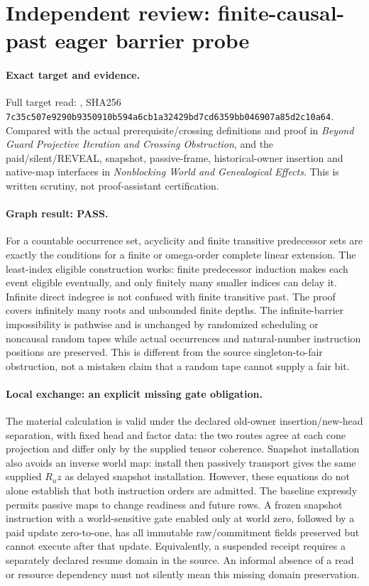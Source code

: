 \documentclass{article}
\begin{document}
\section*{Independent review: finite-causal-past eager barrier probe}
\paragraph{Exact target and evidence.}
Full target read: , SHA256
\texttt{7c35c507e9290b9350910b594a6cb1a32429bd7cd6359bb046907a85d2c10a64}.
Compared with the actual prerequisite/crossing definitions and proof in \emph{Beyond Guard Projective Iteration and Crossing Obstruction}, and the paid/silent/REVEAL, snapshot, passive-frame, historical-owner insertion and native-map interfaces in \emph{Nonblocking World and Genealogical Effects}. This is written scrutiny, not proof-assistant certification.

\paragraph{Graph result: PASS.}
For a countable occurrence set, acyclicity and finite transitive predecessor sets are exactly the conditions for a finite or omega-order complete linear extension. The least-index eligible construction works: finite predecessor induction makes each event eligible eventually, and only finitely many smaller indices can delay it. Infinite direct indegree is not confused with finite transitive past. The proof covers infinitely many roots and unbounded finite depths. The infinite-barrier impossibility is pathwise and is unchanged by randomized scheduling or noncausal random tapes while actual occurrences and natural-number instruction positions are preserved. This is different from the source singleton-to-fair obstruction, not a mistaken claim that a random tape cannot supply a fair bit.

\paragraph{Local exchange: an explicit missing gate obligation.}
The material calculation is valid under the declared old-owner insertion/new-head separation, with fixed head and factor data: the two routes agree at each cone projection and differ only by the supplied tensor coherence. Snapshot installation also avoids an inverse world map: install then passively transport gives the same supplied $R_u z$ as delayed snapshot installation. However, these equations do not alone establish that both instruction orders are admitted. The baseline expressly permits passive maps to change readiness and future rows. A frozen snapshot instruction with a world-sensitive gate enabled only at world zero, followed by a paid update zero-to-one, has all immutable raw/commitment fields preserved but cannot execute after that update. Equivalently, a suspended receipt requires a separately declared resume domain in the source. An informal absence of a read or resource dependency must not silently mean this missing domain preservation.
\end{document}
